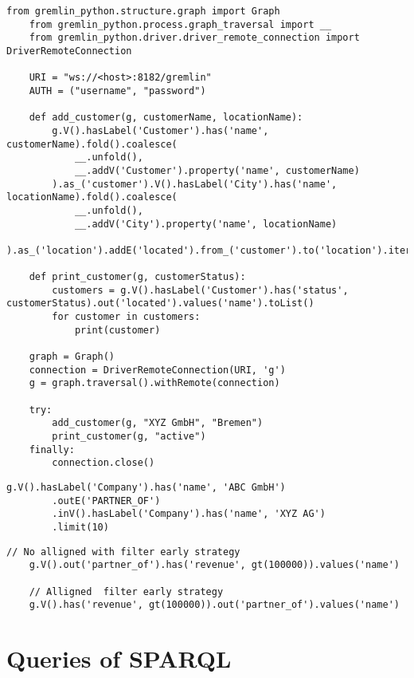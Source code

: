 \begin{lstlisting}[caption={Interact with Gremlin via Python}, label={lst:pythonAndGremlin}]
	from gremlin_python.structure.graph import Graph
	from gremlin_python.process.graph_traversal import __
	from gremlin_python.driver.driver_remote_connection import DriverRemoteConnection

	URI = "ws://<host>:8182/gremlin"
	AUTH = ("username", "password")

	def add_customer(g, customerName, locationName):
		g.V().hasLabel('Customer').has('name', customerName).fold().coalesce(
			__.unfold(),
			__.addV('Customer').property('name', customerName)
		).as_('customer').V().hasLabel('City').has('name', locationName).fold().coalesce(
			__.unfold(),
			__.addV('City').property('name', locationName)
		).as_('location').addE('located').from_('customer').to('location').iterate()

	def print_customer(g, customerStatus):
		customers = g.V().hasLabel('Customer').has('status', customerStatus).out('located').values('name').toList()
		for customer in customers:
			print(customer)

	graph = Graph()
	connection = DriverRemoteConnection(URI, 'g')
	g = graph.traversal().withRemote(connection)

	try:
		add_customer(g, "XYZ GmbH", "Bremen")
		print_customer(g, "active")
	finally:
		connection.close()
\end{lstlisting}

\begin{lstlisting}[caption={Set Limits in Gremlin}, label={lst:limitGremlin}]
	g.V().hasLabel('Company').has('name', 'ABC GmbH')
		.outE('PARTNER_OF')
		.inV().hasLabel('Company').has('name', 'XYZ AG')
		.limit(10)
\end{lstlisting}

\begin{lstlisting}[caption={Apply filter early strategy in Gremlin}, label={lst:filterEarlyGremlin}]
	// No alligned with filter early strategy
	g.V().out('partner_of').has('revenue', gt(100000)).values('name')

	// Alligned  filter early strategy
	g.V().has('revenue', gt(100000)).out('partner_of').values('name')

\end{lstlisting}


\section{Queries of SPARQL}


